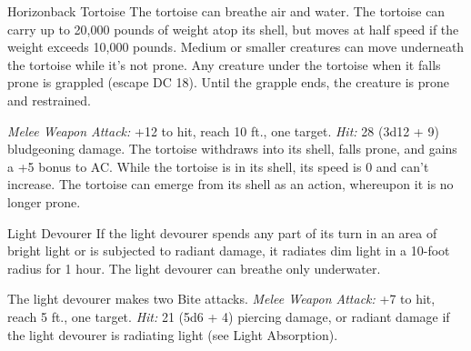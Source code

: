 \documentclass[10pt,a4paper,twoside,twocolumn,openany,bg=none,nodeprecatedcode]{dndbook}
\begin{document}
\begin{DndMonster}[float*=t]{Horizonback Tortoise}
\DndMonsterBasics[
armor-class = {17 (natural armor) (22 while in its shell)},
hit-points = {\DndDice{13d20 + 91}},
speed = {20 ft.}
]
\DndMonsterAbilityScores[
 str = 28,
 dex = 3,
 con = 25,
 int = 4,
 wis = 10,
 cha = 5
]
\DndMonsterDetails[
saving-throws = {Str +12, Con +10},
damage-immunities = {poison},
senses = {darkvision 60 ft, passive perception 10},
languages = {understands Goblin but can't speak},
challenge = 8,
]
The tortoise can breathe air and water.
The tortoise can carry up to 20,000 pounds of weight atop its shell, but moves at half speed if the weight exceeds 10,000 pounds. Medium or smaller creatures can move underneath the tortoise while it's not prone.
Any creature under the tortoise when it falls prone is grappled (escape DC 18). Until the grapple ends, the creature is prone and restrained.
\par
{}
\textsl{Melee Weapon Attack:} +12 to hit, reach 10 ft., one target. \textsl{Hit:} 28 (3d12 + 9) bludgeoning damage.
The tortoise withdraws into its shell, falls prone, and gains a +5 bonus to AC. While the tortoise is in its shell, its speed is 0 and can't increase. The tortoise can emerge from its shell as an action, whereupon it is no longer prone.
\end{DndMonster}


\begin{DndMonster}[float*=t]{Light Devourer}
\DndMonsterBasics[
armor-class = {14},
hit-points = {\DndDice{14d8 + 56}},
speed = {0 ft., 30 ft. (key)}
]
\DndMonsterAbilityScores[
 str = 18,
 dex = 18,
 con = 18,
 int = 2,
 wis = 10,
 cha = 3
]
\DndMonsterDetails[
skills = {Perception +3, Stealth +10},
damage-immunities = {radiant},
senses = {darkvision 120 ft., passive perception 13},
challenge = 6,
]
If the light devourer spends any part of its turn in an area of bright light or is subjected to radiant damage, it radiates dim light in a 10-foot radius for 1 hour.
The light devourer can breathe only underwater.
\par
{}
The light devourer makes two Bite attacks.
\textsl{Melee Weapon Attack:} +7 to hit, reach 5 ft., one target. \textsl{Hit:} 21 (5d6 + 4) piercing damage, or radiant damage if the light devourer is radiating light (see Light Absorption).
\end{DndMonster}
\end{document}
